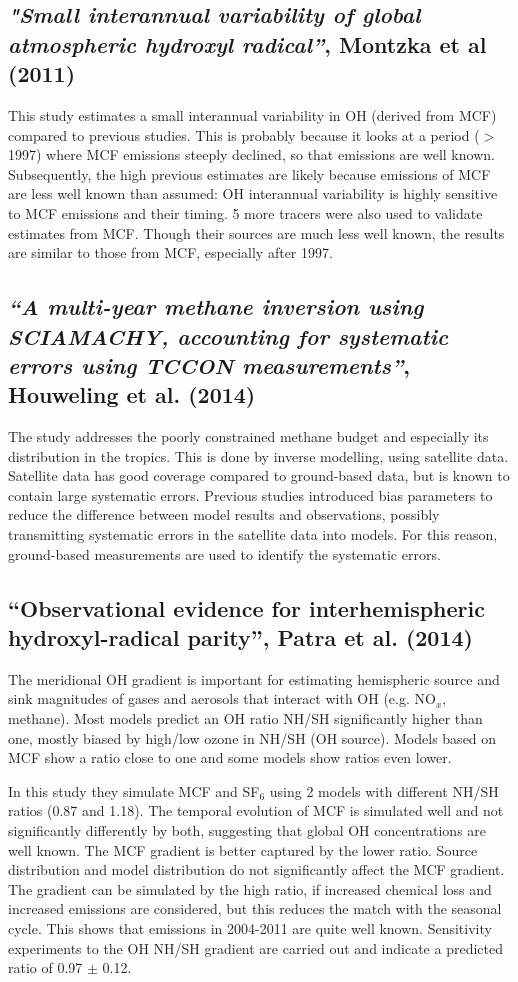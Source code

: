 \subsection{\textit{"Small interannual variability of global atmospheric hydroxyl radical”}, Montzka et al (2011)}
This study estimates a small interannual variability in OH (derived from MCF) compared to previous studies. This is probably because it looks at a period ($>$ 1997) where MCF emissions steeply declined, so that emissions are well known. Subsequently, the high previous estimates are likely because emissions of MCF are less well known than assumed: OH interannual variability is highly sensitive to MCF emissions and their timing.
5 more tracers were also used to validate estimates from MCF. Though their sources are much less well known, the results are similar to those from MCF, especially after 1997.

\subsection{\textit{“A multi-year methane inversion using SCIAMACHY, accounting for systematic errors using TCCON measurements”}, Houweling et al. (2014)}
The study addresses the poorly constrained methane budget and especially its distribution in the tropics. This is done by inverse modelling, using satellite data. Satellite data has good coverage compared to ground-based data, but is known to contain large systematic errors.
Previous studies introduced bias parameters to reduce the difference between model results and observations, possibly transmitting systematic errors in the satellite data into models. For this reason, ground-based measurements are used to identify the systematic errors. 

\subsection{“Observational evidence for interhemispheric hydroxyl-radical parity”, Patra et al. (2014)}
The meridional OH gradient is important for estimating hemispheric source and sink magnitudes of gases and aerosols that interact with OH (e.g. NO$_x$, methane). Most models predict an OH ratio NH/SH significantly higher than one, mostly biased by high/low ozone in NH/SH (OH source). Models based on MCF show a ratio close to one and some models show ratios even lower.

In this study they simulate MCF and SF$_6$ using 2 models with different NH/SH ratios (0.87 and 1.18). The temporal evolution of MCF is simulated well and not significantly differently by both, suggesting that global OH concentrations are well known. The MCF gradient is better captured by the lower ratio. Source distribution and model distribution do not significantly affect the MCF gradient. The gradient can be simulated by the high ratio, if increased chemical loss and increased emissions are considered, but this reduces the match with the seasonal cycle. This shows that emissions in 2004-2011 are quite well known. Sensitivity experiments to the OH NH/SH gradient are carried out and indicate a predicted ratio of 0.97 $\pm$ 0.12.

